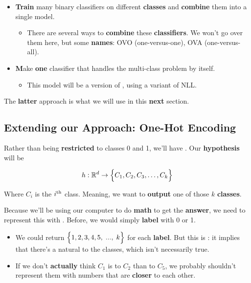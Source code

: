         \begin{itemize}
            \item \textbf{Train} many binary classifiers on different \textbf{classes} and \textbf{combine} them into a single model.
                \begin{itemize}
                    \item There are several ways to \textbf{combine} these \textbf{classifiers}. We won't go over them here, but some \textbf{names}: OVO (one-versus-one), OVA (one-versus-all).
                \end{itemize}
                
            \item \textbf Make \textbf{one} classifier that handles the multi-class problem by itself. 
                \begin{itemize}
                    \item This model will be a  version of , using a variant of NLL.
                \end{itemize}
    \end{itemize}
    
    The \textbf{latter} approach is what we will use in this \textbf{next} section.
    
    \subsection{Extending our Approach: One-Hot Encoding}
    
        Rather than being \textbf{restricted} to classes 0 and 1, we'll have . Our \textbf{hypothesis} will be
        
        \begin{equation*}
            h: \mathbb R^d \rightarrow \Bigl\{C_1, C_2, C_3, \dots, C_k \Bigr\}
        \end{equation*}
        
        Where $C_i$ is the $i^{ \text{th} }$ class. Meaning, we want to \textbf{output} one of those $k$ \textbf{classes}.
        
        Because we'll be using our computer to do \textbf{math} to get the \textbf{answer}, we need to represent this with . Before, we would simply \textbf{label} with 0 or 1. 

        \begin{itemize}
            \item We could return $\Bigl\{1,2,3,4,5 , \;..., \; k\Bigr\}$ for each \textbf{label}. But this is : it implies that there's a natural  to the classes, which isn't necessarily true.

            \item If we don't \textbf{actually} think $C_1$ is  to $C_2$ than to $C_5$, we probably shouldn't represent them with numbers that are \textbf{closer} to each other.
        \end{itemize}
        
